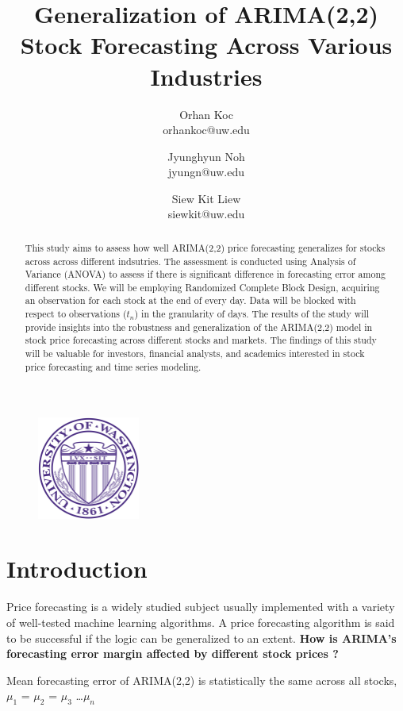 \documentclass{article}
\title{Generalization of ARIMA(2,2) Stock Forecasting Across Various Industries}
\author{ Orhan Koc \\ orhankoc@uw.edu \and
         Jyunghyun Noh \\ jyungn@uw.edu \and
         Siew Kit Liew \\ siewkit@uw.edu
    }
\begin{document}
 

    \begin{figure}
        \centering
        \includegraphics[width=0.30\textwidth]{../assets/uw.png}
    \end{figure}
    \maketitle

    \begin{abstract}
        This study aims to assess how well ARIMA(2,2) price forecasting generalizes for stocks across across different indsutries. The assessment is conducted using Analysis of Variance (ANOVA) to assess if there is significant difference in forecasting error among different stocks. We will be employing Randomized Complete Block Design, acquiring an observation for each stock at the end of every day. Data will be blocked with respect to observations ($t_n$) in the granularity of days. 
        The results of the study will provide insights into the robustness and generalization of the ARIMA(2,2) model in stock price forecasting across different stocks and markets. The findings of this study will be valuable for investors, financial analysts, and academics interested in stock price forecasting and time series modeling.
    \end{abstract}

    \newpage

    \section{Introduction}
    Price forecasting is a widely studied subject usually implemented with a variety of well-tested machine learning algorithms. A price forecasting algorithm is said to be successful if the logic can be generalized to an extent. \textbf{How is ARIMA's forecasting error margin affected by different stock prices ?}

    \setcounter{hyp}{-1}
    \begin{hyp} 
        \label{hyp:a}Mean forecasting error of ARIMA(2,2) is statistically the same across all stocks, $\mu_{1}$ = $\mu_{2}$ = $\mu_{3}$ \dots $\mu_{n}$  
    \end{hyp}
\end{document}
